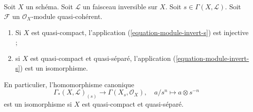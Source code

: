 \begin{lemma}
\label{lemma-invert-s-sections}
\begin{reference}
\cite[section 6.8]{EGA1-second}
\end{reference}
Soit $X$ un schéma. Soit $\mathcal{L}$ un faisceau inversible sur $X$.
Soit $s \in \Gamma(X, \mathcal{L})$. Soit $\mathcal{F}$ un
$\mathcal{O}_X$-module quasi-cohérent.
\begin{enumerate}
\item Si $X$ est quasi-compact, l'application (\ref{equation-module-invert-s})
est injective ;
\item si $X$ est quasi-compact et quasi-séparé, l'application
(\ref{equation-module-invert-s}) est un isomorphisme.
\end{enumerate}
En particulier, l'homomorphisme canonique
$$
\Gamma_*(X, \mathcal{L})_{(s)}
\longrightarrow
\Gamma(X_s, \mathcal{O}_X),\quad
a/s^n \longmapsto a \otimes s^{-n}
$$
est un isomorphisme si $X$ est quasi-compact et quasi-séparé.
\end{lemma}

